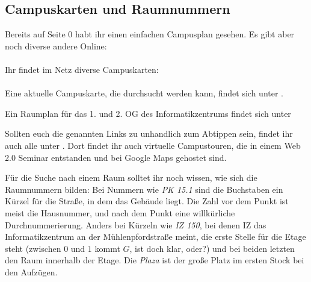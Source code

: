 \subsection{Campuskarten und Raumnummern}
\label{campuskarte}
\ifpdf %
Bereits auf Seite 0 habt ihr einen einfachen Campusplan
gesehen. Es gibt aber noch diverse andere Online:\\\\
\else
Ihr findet im Netz diverse Campuskarten:\\\\
\fi
Eine aktuelle Campuskarte, die durchsucht werden kann, findet sich unter .

Ein Raumplan für das 1. und 2. OG des Informatikzentrums findet sich
unter 

Sollten euch die genannten Links zu unhandlich zum Abtippen sein, findet ihr
auch alle unter .
Dort findet ihr auch virtuelle Campustouren, die  in einem Web 2.0 Seminar entstanden und
bei Google Maps gehostet sind.

Für die Suche nach einem Raum solltet ihr noch wissen, wie sich die Raumnummern bilden: Bei Nummern wie \textit{PK 15.1} sind die Buchstaben ein Kürzel für die Straße, in dem das Gebäude liegt. Die Zahl vor dem Punkt ist meist die Hausnummer, und nach dem Punkt eine willkürliche Durchnummerierung. Anders bei Kürzeln wie \textit{IZ 150}, bei denen IZ das Informatikzentrum an der Mühlenpfordstraße meint, die erste Stelle für die Etage steht (zwischen $0$ und $1$ kommt $G$, ist doch klar, oder?) und bei beiden letzten den Raum innerhalb der Etage. Die \textit{Plaza} ist der große Platz im ersten Stock bei den Aufzügen.
